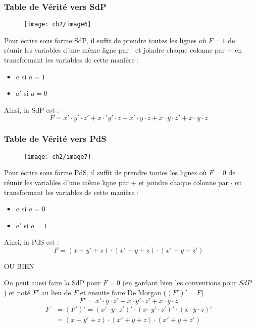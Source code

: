 \subsubsection{Table de Vérité vers SdP}
\begin{figure}[H]
	\centering
	\texttt{[image: ch2/image6]}
\end{figure}
Pour écrire sous forme SdP, il suffit de prendre toutes les lignes où $F=1$ de réunir les variables d'une même ligne par $\cdot$ et joindre chaque colonne par $+$ en transformant les variables de cette manière :
\begin{itemize}
	\item $a$ si $a=1$
	\item $a'$ si $a=0$
\end{itemize}
Ainsi, la SdP est :
\begin{equation}
	F=x'\cdot y'\cdot z'+x\cdot' y'\cdot z+x'\cdot y\cdot z+x\cdot y\cdot z'+x\cdot y\cdot z
\end{equation}
\subsubsection{Table de Vérité vers PdS}
\begin{figure}[H]
	\centering
	\texttt{[image: ch2/image7]}
\end{figure}
Pour écrire sous forme PdS, il suffit de prendre toutes les lignes où $F=0$ de réunir les variables d'une même ligne par $+$ et joindre chaque colonne par $\cdot$ en transformant les variables de cette manière :
\begin{itemize}
	\item $a$ si $a=0$
	\item $a'$ si $a=1$
\end{itemize}
Ainsi, la PdS est :
\begin{equation}
F=(x+y'+z)\cdot(x'+y+z)\cdot(x'+y+z')
\end{equation}
\begin{center}
	OU BIEN
\end{center}
On peut aussi faire la SdP pour $F=0$ (en gardant bien les conventions pour $SdP$) et noté $F'$ au lieu de $F$ et ensuite faire De Morgan ($(F')'=F$)
\begin{equation}
F'= x'\cdot y\cdot z'+x\cdot y'\cdot z'+x\cdot y\cdot z
\end{equation}
\begin{align}
	F &=(F')'=(x'\cdot y\cdot z')'\cdot(x\cdot y'\cdot z')'\cdot(x\cdot y\cdot z)'\\
	&= (x+y'+z)\cdot(x'+y+z)\cdot(x'+y+z')
\end{align}
